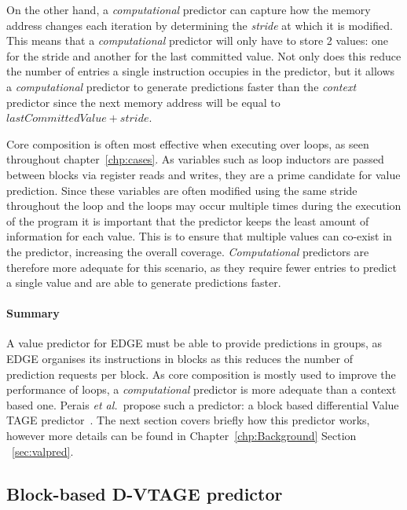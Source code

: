 On the other hand, a \textit{computational} predictor can capture how the memory address changes each iteration by determining the \textit{stride} at which it is modified.
This means that a \textit{computational} predictor will only have to store 2 values: one for the stride and another for the last committed value.
Not only does this reduce the number of entries a single instruction occupies in the predictor, but it allows a \textit{computational} predictor to generate predictions faster than the \textit{context} predictor since the next memory address will be equal to $ lastCommittedValue + stride$.

Core composition is often most effective when executing over loops, as seen throughout chapter~\ref{chp:cases}.
As variables such as loop inductors are passed between blocks via register reads and writes, they are a prime candidate for value prediction.
Since these variables are often modified using the same stride throughout the loop and the loops may occur multiple times during the execution of the program it is important that the predictor keeps the least amount of information for each value.
This is to ensure that multiple values can co-exist in the predictor, increasing the overall coverage.
\textit{Computational} predictors are therefore more adequate for this scenario, as they require fewer entries to predict a single value and are able to generate predictions faster.


\paragraph*{Summary}

A value predictor for EDGE must be able to provide predictions in groups, as EDGE organises its instructions in blocks as this reduces the number of prediction requests per block.
As core composition is mostly used to improve the performance of loops, a \textit{computational} predictor is more adequate than a context based one.
Perais {\it et al.~}propose such a predictor: a block based differential Value TAGE predictor~\cite{peraisBeBop2015}.
The next section covers briefly how this predictor works, however more details can be found in Chapter~\ref{chp:Background} Section ~\ref{sec:valpred}.

\subsection{Block-based D-VTAGE predictor}

